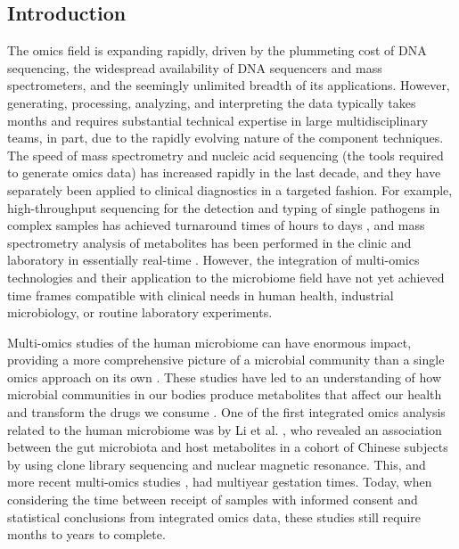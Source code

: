 \subsection{Introduction}

The omics field is expanding rapidly, driven by the plummeting cost of DNA sequencing,
the widespread availability of DNA sequencers and mass spectrometers, and the seemingly
unlimited breadth of its applications. However, generating, processing, analyzing,
and interpreting the data typically takes months and requires substantial technical
expertise in large multidisciplinary teams, in part, due to the rapidly evolving nature
of the component techniques. The speed of mass spectrometry and nucleic acid sequencing
(the tools required to generate omics data) has increased rapidly in the last decade,
and they have separately been applied to clinical diagnostics in a targeted fashion.
For example, high-throughput sequencing for the detection and typing of single pathogens
in complex samples has achieved turnaround times of hours to
days \cite{Read2002,Mellmann2011,Naccache2014,Greninger2015,Quick2016}, and mass
spectrometry analysis of metabolites has been performed in the clinic and laboratory
in essentially real-time \cite{Balog2013, Hsu2013}. However, the integration of
multi-omics technologies and their application to the microbiome field have not
yet achieved time frames compatible with clinical needs in human health, industrial
microbiology, or routine laboratory experiments.

Multi-omics studies of the human microbiome can have enormous impact, providing a
more comprehensive picture of a microbial community than a single omics approach on
its own \cite{Fritz2013, Franzosa2015}. These studies have led to an understanding
of how microbial communities in our bodies produce metabolites that affect our
health and transform the drugs we consume \cite{Wang2011,Koeth2013,Haiser2013,Maurice2013}.
One of the first integrated omics analysis related to the human microbiome was by
Li et al. \cite{Li2008}, who revealed an association between the gut microbiota and
host metabolites in a cohort of Chinese subjects by using clone library sequencing
and nuclear magnetic resonance. This, and more recent multi-omics studies
\cite{Smith2013, Ridaura2013}, had multiyear gestation times. Today, when considering
the time between receipt of samples with informed consent and statistical conclusions
from integrated omics data, these studies still require months to years to complete.

